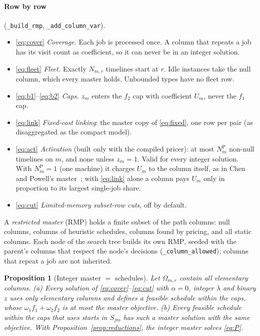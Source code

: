 \documentclass[11pt,a4paper]{article}
\newtheorem{proposition}[theorem]{Proposition}
\theoremstyle{definition}
\theoremstyle{remark}
\newcommand{\Om}{\Omega}
\newcommand{\code}[1]{\texttt{#1}}
\newcommand{\RMP}{\mathrm{RMP}}
\begin{document}
\paragraph{Row by row} (\code{\_build\_rmp}, \code{\_add\_column\_var}).
\begin{itemize}[leftmargin=*]
\item \eqref{eq:cover} \emph{Coverage.} Each job is processed once. A column
  that repeats a job has its visit count as coefficient, so it can never be in
  an integer solution.
\item \eqref{eq:fleet} \emph{Fleet.} Exactly $N_{m,r}$ timelines start at $r$.
  Idle instances take the null column, which every master holds. Unbounded
  types have no fleet row.
\item \eqref{eq:b1}--\eqref{eq:b2} \emph{Caps.} $z_m$ enters the $f_2$ cap
  with coefficient $U_m$, never the $f_1$ cap.
\item \eqref{eq:link} \emph{Fixed-cost linking}: the master copy of
  \eqref{eq:fixed}, one row per pair (as disaggregated as the compact model).
\item \eqref{eq:act} \emph{Activation} (built only with the compiled pricer):
  at most $N^{\mathrm P}_m$ non-null timelines on $m$, and none unless $z_m=1$.
  Valid for every integer solution. With $N^{\mathrm P}_m=1$ (one machine) it
  charges $U_m$ to the column itself, as in Chen and Powell's
  master~\cite{chen1999}; with \eqref{eq:link} alone a column pays $U_m$ only in
  proportion to its largest single-job share.
\item \eqref{eq:cut} \emph{Limited-memory subset-row cuts}, off by default.
\end{itemize}

A \emph{restricted master} ($\RMP$) holds a finite subset of the path columns:
null columns, columns of heuristic schedules, columns found by pricing, and all
static columns. Each node of the search tree builds its own $\RMP$, seeded with
the parent's columns that respect the node's decisions
(\code{\_column\_allowed}); columns that repeat a job are not inherited.

\begin{proposition}[Integer master $=$ schedules]\label{prop:integer}
Let $\Om_{m,r}$ contain all elementary columns.
(a) Every solution of \eqref{eq:cover}--\eqref{eq:cut} with $\alpha=0$,
integer $\lambda$ and binary $z$ uses only elementary columns and defines a
feasible schedule within the caps, whose $\omega_1f_1+\omega_2f_2$ is at most
the master objective.
(b) Every feasible schedule within the caps that uses starts in $S_{jm}$ has
such a master solution with the same objective.
With Proposition~\ref{prop:reductions}, the integer master solves \eqref{eq:P}.
\end{proposition}
\end{document}
